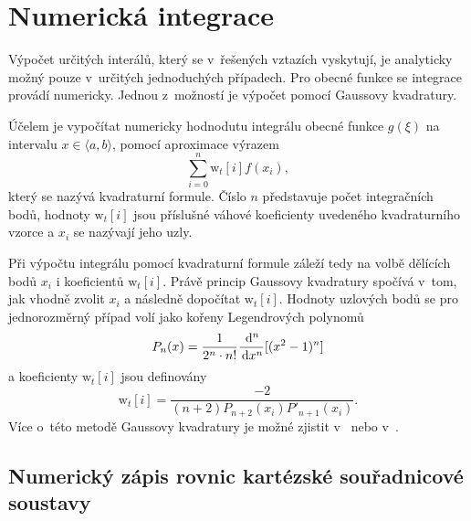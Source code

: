 \section{Numerická integrace}
Výpočet určitých interálů, který se v~řešených vztazích vyskytují, je analyticky možný pouze v~určitých jednoduchých případech. Pro obecné funkce se integrace provádí numericky. Jednou z~možností je výpočet pomocí Gaussovy kvadratury.

Účelem je vypočítat numericky hodnodutu integrálu obecné funkce $g(\xi)$ na intervalu $x\in\langle a, b\rangle$,  pomocí aproximace výrazem
\begin{displaymath}
\sum_{i=0}^{n}\mathrm{w}_{t}[i]f(x_{i}),
\end{displaymath}
který se nazývá kvadraturní formule. Číslo $n$ představuje počet integračních bodů, hodnoty $\mathrm{w}_{t}[i]$ jsou příslušné váhové koeficienty uvedeného kvadraturního vzorce a $x_{i}$ se nazývají jeho uzly. 

Při výpočtu integrálu pomocí kvadraturní formule záleží tedy na volbě dělících bodů $x_{i}$ i koeficientů $\mathrm{w}_{t}[i]$. Právě princip Gaussovy kvadratury spočívá v~tom, jak vhodně zvolit $x_{i}$ a následně dopočítat $\mathrm{w}_{t}[i]$. Hodnoty uzlových bodů se pro jednorozměrný případ volí jako kořeny Legendrových polynomů
\begin{displaymath}
	P_{n}(x) = \frac{1}{2^{n}\cdot n!}\frac{\,\mathrm{d}^{n}}{\,\mathrm{d} x^{n}}[(x^{2} - 1)^{n}]
\end{displaymath}
a koeficienty $\mathrm{w}_{t}[i]$ jsou definovány
\begin{displaymath}
\mathrm{w}_{t}[i] = \frac{-2}{(n+2)P_{n+2}(x_i)P'_{n+1}(x_i)}.
\end{displaymath}
Více o~této metodě Gaussovy kvadratury je možné zjistit v~\cite{gk_tichy} nebo v~\cite{gk_kaw}.

\subsection{Numerický zápis rovnic kartézské souřadnicové soustavy}
